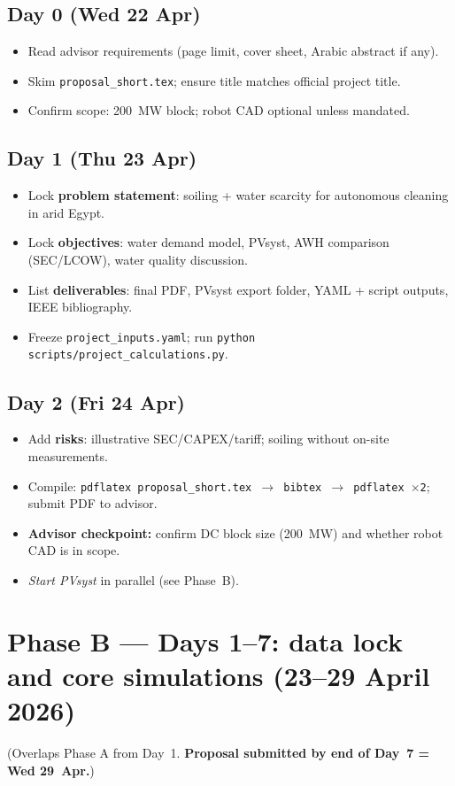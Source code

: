 \documentclass[11pt,a4paper]{article}
\begin{document}
\subsection{Day 0 (Wed 22 Apr)}
\begin{itemize}[nosep]
  \item Read advisor requirements (page limit, cover sheet, Arabic abstract if any).
  \item Skim \texttt{proposal\_short.tex}; ensure title matches official project title.
  \item Confirm scope: 200~MW block; robot CAD optional unless mandated.
\end{itemize}

\subsection{Day 1 (Thu 23 Apr)}
\begin{itemize}[nosep]
  \item Lock \textbf{problem statement}: soiling + water scarcity for autonomous cleaning in arid Egypt.
  \item Lock \textbf{objectives}: water demand model, PVsyst, AWH comparison (SEC/LCOW), water quality discussion.
  \item List \textbf{deliverables}: final PDF, PVsyst export folder, YAML + script outputs, IEEE bibliography.
  \item Freeze \texttt{project\_inputs.yaml}; run \texttt{python scripts/project\_calculations.py}.
\end{itemize}

\subsection{Day 2 (Fri 24 Apr)}
\begin{itemize}[nosep]
  \item Add \textbf{risks}: illustrative SEC/CAPEX/tariff; soiling without on-site measurements.
  \item Compile: \texttt{pdflatex proposal\_short.tex $\rightarrow$ bibtex $\rightarrow$ pdflatex $\times$2}; submit PDF to advisor.
  \item \textbf{Advisor checkpoint:} confirm DC block size (200~MW) and whether robot CAD is in scope.
  \item \textit{Start PVsyst} in parallel (see Phase~B).
\end{itemize}

\section{Phase B --- Days 1--7: data lock and core simulations (23--29 April 2026)}
(Overlaps Phase A from Day~1. \textbf{Proposal submitted by end of Day~7 = Wed 29~Apr.})
\end{document}
